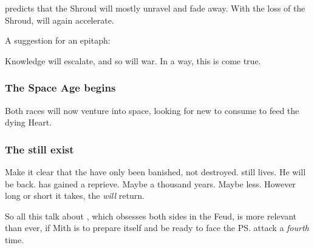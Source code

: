 \Ishnaruchaefir{} predicts that the Shroud will mostly unravel and fade away. With the loss of the Shroud,  will again accelerate. 

A suggestion for an epitaph: 


Knowledge will escalate, and so will war. 
In a way, this is  come true. 






\subsubsection{The Space Age begins}
Both races will now venture into space, looking for new \dweomers{} to consume to feed the dying Heart. 




\subsubsection{The \banes{} still exist}
Make it clear that the \banes{} have only been banished, not destroyed. 
\Daggerrain{} still lives. 
He will be back. 
\Miith{} has gained a reprieve. 
Maybe a thousand years. 
Maybe less.
However long or short it takes, the \banes{} \emph{will} return. 

So all this talk about , which obsesses both sides in the Feud, is more relevant than ever, if Mith is to prepare itself and be ready to face the \ps{\Voidbringer} attack a \emph{fourth} time. 






